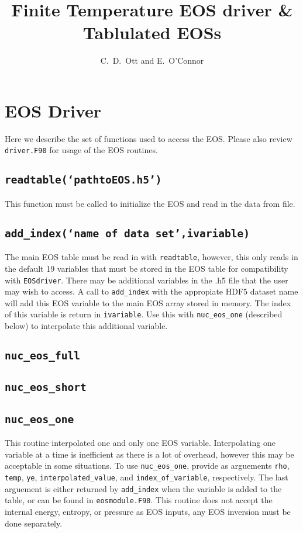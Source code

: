 \documentclass[10pt,nofootinbib]{article}
\title{Finite Temperature EOS driver \& Tablulated EOSs}
\author{C.\ D.\ Ott and E.\ O'Connor}
\newcommand{\code}[1]{\texttt{#1}}
\begin{document}
\maketitle

\section{EOS Driver}

Here we describe the set of functions used to access the EOS.  Please
also review \code{driver.F90} for usage of the EOS routines.

\subsection{\code{readtable(`pathtoEOS.h5')}}

This function must be called to initialize the EOS and read in the
data from file.

\subsection{\code{add\_index(`name of data set',ivariable)}}

The main EOS table must be read in with \code{readtable}, however,
this only reads in the default 19 variables that must be stored in the
EOS table for compatibility with \code{EOSdriver}.  There may be
additional variables in the .h5 file that the user may wish to access.
A call to \code{add\_index} with the appropiate HDF5 dataset name will
add this EOS variable to the main EOS array stored in memory.  The
index of this variable is return in \code{ivariable}.  Use this with
\code{nuc\_eos\_one} (described below) to interpolate this additional
variable.

\subsection{\code{nuc\_eos\_full}}
\subsection{\code{nuc\_eos\_short}}
\subsection{\code{nuc\_eos\_one}}

This routine interpolated one and only one EOS variable.
Interpolating one variable at a time is inefficient as there is a lot
of overhead, however this may be acceptable in some situations.  To
use \code{nuc\_eos\_one}, provide as arguements \code{rho},
\code{temp}, \code{ye}, \code{interpolated\_value}, and
\code{index\_of\_variable}, respectively. The last
arguement is either returned by \code{add\_index} when the variable is
added to the table, or can be found in \code{eosmodule.F90}. This
routine does not accept the internal energy, entropy, or pressure as
EOS inputs, any EOS inversion must be done separately.
\end{document}
